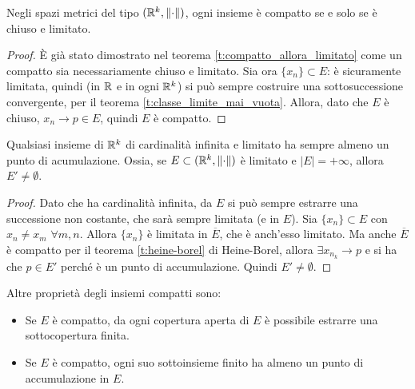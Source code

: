 \begin{teorema}
\label{t:heine-borel}
Negli spazi metrici del tipo $(\mathbb{R}^k,\left\|{\cdot}\right\|)$, ogni insieme è compatto se e solo se è chiuso e limitato.
\end{teorema}
\begin{proof}
È già stato dimostrato nel teorema \ref{t:compatto_allora_limitato} come un compatto sia necessariamente chiuso e limitato.
Sia ora $\{x_n\}\subset E$: è sicuramente limitata, quindi (in $\mathbb{R}$ e in ogni $\mathbb{R}^k$) si può sempre costruire una sottosuccessione convergente, per il teorema \ref{t:classe_limite_mai_vuota}. Allora, dato che $E$ è chiuso, $x_n\to p\in E$, quindi $E$ è compatto.
\end{proof}
\begin{teorema}
\label{t:bolzano-weierstrass}
Qualsiasi insieme di $\mathbb{R}^k$ di cardinalità infinita e limitato ha sempre almeno un punto di acumulazione. Ossia, se $E\subset(\mathbb{R}^k,\left\|{\cdot}\right\|)$ è limitato e $|E|=+\infty$, allora $E'\neq\emptyset$.
\end{teorema}
\begin{proof}
Dato che ha cardinalità infinita, da $E$ si può sempre estrarre una successione non costante, che sarà sempre limitata (e in $E$). Sia $\{x_n\}\subset E$ con $x_n\neq x_m$ $\forall m,n$. Allora $\{x_n\}$ è limitata in $\overline{E}$, che è anch'esso limitato. Ma anche $\overline{E}$ è compatto per il teorema \ref{t:heine-borel} di Heine-Borel, allora $\exists x_{n_k}\to p$ e si ha che $p\in E'$ perché è un punto di accumulazione. Quindi $E'\neq\emptyset$.
\end{proof}
Altre proprietà degli insiemi compatti sono:
\begin{itemize}
\item Se $E$ è compatto, da ogni copertura aperta di $E$ è possibile estrarre una sottocopertura finita.
\item Se $E$ è compatto, ogni suo sottoinsieme finito ha almeno un punto di accumulazione in $E$.
\end{itemize}
